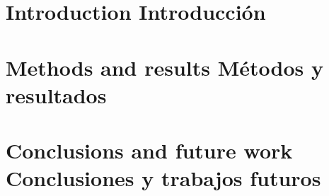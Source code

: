 \documentclass[hidelinks]{svproc}
\def\ingles{}
\begin{document}
\section{
\ifdefined\ingles	
	Introduction
\else
	Introducción
\fi
}


\section{
\ifdefined\ingles	
	Methods and results
\else
	Métodos y resultados
\fi
}


\section{
\ifdefined\ingles	
	Conclusions and future work
\else
	Conclusiones y trabajos futuros
\fi
}




\printbibliography[category=cited]

\end{document}
